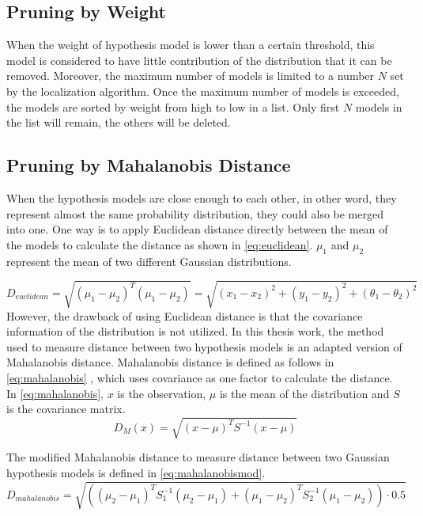\subsection{Pruning by Weight}
\label{sub:Pruning by Weight}
When the weight of hypothesis model is lower than a certain threshold, this model is considered to have little contribution of the distribution that it can be removed. Moreover, the maximum number of models is limited to a number $N$ set by the localization algorithm. Once the maximum number of models is exceeded, the models are sorted by weight from high to low in a list. Only first $N$ models in the list will remain, the others will be deleted.

\subsection{Pruning by Mahalanobis Distance \cite{de2000mahalanobis}}
\label{sub:Prunning Mahalanobis Distance}
When the hypothesis models are close enough to each other, in other word, they represent almost the same probability distribution, they could also be merged into one. One way is to apply Euclidean distance directly between the mean of the models to calculate the distance as shown in \autoref{eq:euclidean}. $\mu_1$ and $\mu_2$ represent the mean of two different Gaussian distributions.

\begin{equation}
\label{eq:euclidean}
D_{euclidean} = \sqrt{(\mu_1 - \mu_2)^T(\mu_1 - \mu_2)}= \sqrt{(x_{1}-x_{2})^2 + (y_{1}-y_{2})^2 + (\theta_{1}-\theta_{2})^2}
\end{equation}
However, the drawback of using Euclidean distance is that the covariance information of the distribution is not utilized. In this thesis work, 
the method used to measure distance between two hypothesis models is an adapted version of Mahalanobis distance. Mahalanobis distance is defined as follows in \autoref{eq:mahalanobis} \cite{de2000mahalanobis}, which uses covariance as one factor to calculate the distance. In \autoref{eq:mahalanobis}, $x$ is the observation, $\mu$ is the mean of the distribution and $S$ is the covariance matrix.
\begin{equation}
\label{eq:mahalanobis}
D_M(x) = \sqrt{(x - \mu)^T S^{-1} (x-\mu)}
\end{equation}

The modified Mahalanobis distance to measure distance between two Gaussian hypothesis models is defined in \autoref{eq:mahalanobismod}.
\begin{equation}
\label{eq:mahalanobismod}
D_{mahalanobis} = \sqrt{((\mu_2 - \mu_1)^T S_1^{-1} (\mu_2-\mu_1) + (\mu_1 - \mu_2)^T S_2^{-1} (\mu_1-\mu_2)) \cdot 0.5}
\end{equation}

